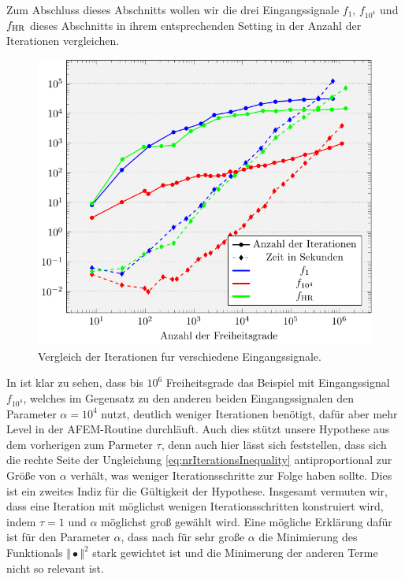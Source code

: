 Zum Abschluss dieses Abschnitts wollen wir die drei Eingangssignale
$f_1$, $f_{10^4}$ und $f_\textup{HR}$ dieses Abschnitts in ihrem entsprechenden
Setting in der Anzahl der Iterationen vergleichen.
\begin{figure}[p]
  \centering
  \includegraphics[width=\linewidth]
    {pictures/chapExperiments/secExactSol/nrIterComp/miscF.pdf}
  \caption{Vergleich der Iterationen fur verschiedene Eingangssignale.}
  \label{fig:inSiNrIterComparison}
\end{figure}
In  ist klar zu sehen, dass bis $10^6$
Freiheitsgrade das Beispiel mit Eingangssignal $f_{10^4}$, welches im Gegensatz
zu den anderen beiden Eingangssignalen den Parameter $\alpha=10^4$ nutzt,
deutlich weniger Iterationen benötigt, dafür aber mehr Level in der
AFEM-Routine durchläuft. 
Auch dies stützt unsere Hypothese aus dem
vorherigen  zum Parmeter $\tau$, denn
auch hier lässt sich feststellen, dass sich die rechte Seite der Ungleichung
\eqref{eq:nrIterationsInequality} antiproportional zur Größe von $\alpha$
verhält, was weniger Iterationsschritte zur Folge haben sollte. 
Dies ist ein zweites Indiz für die Gültigkeit der Hypothese. 
Insgesamt vermuten wir, dass eine Iteration mit möglichst wenigen
Iterationsschritten konstruiert wird, indem $\tau=1$ und $\alpha$ möglichst
groß gewählt wird.
Eine mögliche Erklärung dafür ist für den Parameter $\alpha$, dass
nach  für sehr große $\alpha$ die Minimierung
des Funktionals $\Vert\bullet\Vert^2$ stark gewichtet ist und die 
Minimerung der anderen Terme nicht so relevant ist.


